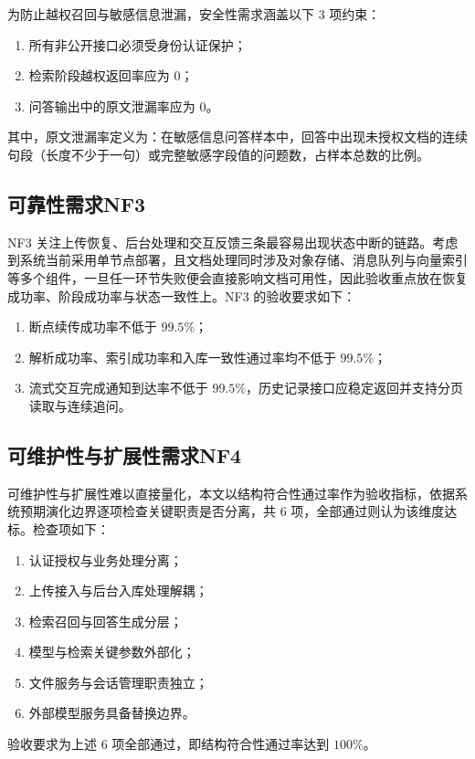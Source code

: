 为防止越权召回与敏感信息泄漏，安全性需求涵盖以下 3 项约束：
\begin{enumerate}[label=(\arabic*)]
    \item 所有非公开接口必须受身份认证保护；
    \item 检索阶段越权返回率应为 $0$；
    \item 问答输出中的原文泄漏率应为 $0$。
\end{enumerate}

其中，原文泄漏率定义为：在敏感信息问答样本中，回答中出现未授权文档的连续句段（长度不少于一句）或完整敏感字段值的问题数，占样本总数的比例。

\subsection{可靠性需求NF3}

NF3 关注上传恢复、后台处理和交互反馈三条最容易出现状态中断的链路。考虑到系统当前采用单节点部署，且文档处理同时涉及对象存储、消息队列与向量索引等多个组件，一旦任一环节失败便会直接影响文档可用性，因此验收重点放在恢复成功率、阶段成功率与状态一致性上。NF3 的验收要求如下：
\begin{enumerate}[label=(\arabic*)]
    \item 断点续传成功率不低于 $99.5\%$；
    \item 解析成功率、索引成功率和入库一致性通过率均不低于 $99.5\%$；
    \item 流式交互完成通知到达率不低于 $99.5\%$，历史记录接口应稳定返回并支持分页读取与连续追问。
\end{enumerate}

\subsection{可维护性与扩展性需求NF4}

可维护性与扩展性难以直接量化，本文以结构符合性通过率作为验收指标，依据系统预期演化边界逐项检查关键职责是否分离，共 6 项，全部通过则认为该维度达标。检查项如下：
\begin{enumerate}[label=(\arabic*)]
    \item 认证授权与业务处理分离；
    \item 上传接入与后台入库处理解耦；
    \item 检索召回与回答生成分层；
    \item 模型与检索关键参数外部化；
    \item 文件服务与会话管理职责独立；
    \item 外部模型服务具备替换边界。
\end{enumerate}

验收要求为上述 6 项全部通过，即结构符合性通过率达到 $100\%$。
